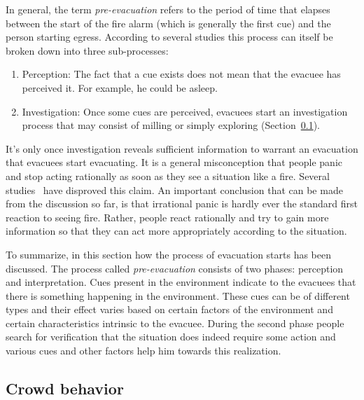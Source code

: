 In general, the term \emph{pre-evacuation} refers to the period of time that elapses between the start of the fire alarm (which is generally the first cue) and the person starting egress. According to several studies this process can itself be broken down into three sub-processes:

\begin{enumerate}
	\item Perception: The fact that a cue exists does not mean that the evacuee has perceived it. For example, he could be asleep.
	\item Investigation: Once some cues are perceived, evacuees start an investigation process that may consist of milling or simply exploring (Section~\ref{LiteratureReview:CrowdBehavior}).
\end{enumerate}

It's only once investigation reveals sufficient information to warrant an evacuation that evacuees start evacuating. It is a general misconception that people panic and stop acting rationally as soon as they see a situation like a fire. Several studies~\cite{Kobes:2009jx,Schadschneider:2008cz,Reicher:2008ep,Torres:2010tj,Paulsen:1984ti,Sime:1983uy} have disproved this claim. An important conclusion that can be made from the discussion so far, is that irrational panic is hardly ever the standard first reaction to seeing fire. Rather, people react rationally and try to gain more information so that they can act more appropriately according to the situation.

To summarize, in this section how the process of evacuation starts has been discussed. The process called \emph{pre-evacuation} consists of two phases: perception and interpretation. Cues present in the environment indicate to the evacuees that there is something happening in the environment. These cues can be of different types and their effect varies based on certain factors of the environment and certain characteristics intrinsic to the evacuee. During the second phase people search for verification that the situation does indeed require some action and various cues and other factors help him towards this realization.  %

\subsection{Crowd behavior}
\label{LiteratureReview:CrowdBehavior}


